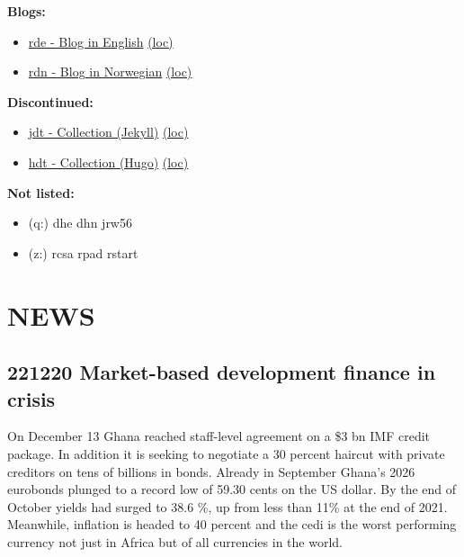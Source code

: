 \documentclass[
]{book}
\providecommand{\tightlist}{%
  \setlength{\itemsep}{0pt}\setlength{\parskip}{0pt}}
\begin{document}
\textbf{Blogs:}

\begin{itemize}
\tightlist
\item
  \href{https://dyrehaugen.github.io/rde}{rde - Blog in English} \href{http://localhost/rde}{(loc)}
\item
  \href{https://dyrehaugen.github.io/rdn}{rdn - Blog in Norwegian} \href{http://localhost/rdn}{(loc)}
\end{itemize}

\textbf{Discontinued:}

\begin{itemize}
\tightlist
\item
  \href{https://dyrehaugen.github.io/jdt}{jdt - Collection (Jekyll)} \href{http://localhost/jdt}{(loc)}
\item
  \href{https://dyrehaugen.github.io/hdt}{hdt - Collection (Hugo)} \href{http://localhost/hdt}{(loc)}
\end{itemize}

\textbf{Not listed:}

\begin{itemize}
\tightlist
\item
  (q:) dhe dhn jrw56
\item
  (z:) rcsa rpad rstart
\end{itemize}

\hypertarget{news}{%
\chapter{NEWS}\label{news}}

\hypertarget{market-based-development-finance-in-crisis-1}{%
\section{221220 Market-based development finance in crisis}\label{market-based-development-finance-in-crisis-1}}

On December 13 Ghana reached staff-level agreement on a \$3 bn IMF credit package. In addition it is seeking to negotiate a 30 percent haircut with private creditors on tens of billions in bonds. Already in September Ghana's 2026 eurobonds plunged to a record low of 59.30 cents on the US dollar. By the end of October yields had surged to 38.6 \%, up from less than 11\% at the end of 2021. Meanwhile, inflation is headed to 40 percent and the cedi is the worst performing currency not just in Africa but of all currencies in the world.
\end{document}
